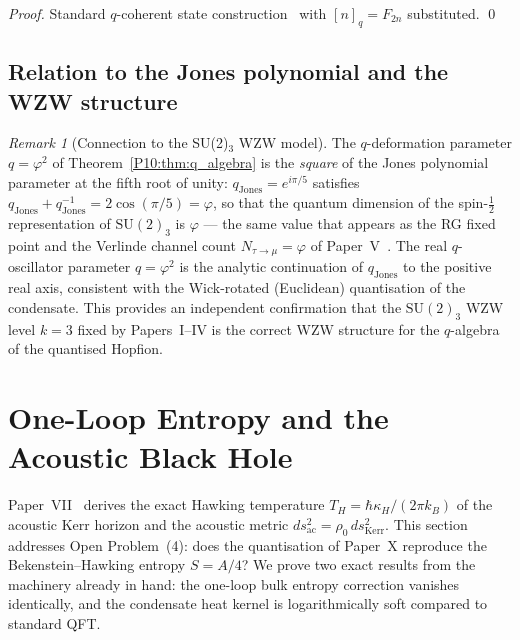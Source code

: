 \documentclass[11pt,a4paper]{article}
\theoremstyle{definition}
\theoremstyle{remark}
\newtheorem{remark}[theorem]{Remark}
\newcommand{\vp}{\varphi}
\begin{document}
\begin{proof}
Standard $q$-coherent state construction~\cite{Macfarlane1989,Biedenharn1989}
with $[n]_q = F_{2n}$ substituted.
\qed
\end{proof}

\subsection{Relation to the Jones polynomial and the WZW structure}

\begin{remark}[Connection to the SU(2)$_3$ WZW model]
\label{P10:rem:jones}
The $q$-deformation parameter $q = \vp^2$ of Theorem~\ref{P10:thm:q_algebra}
is the \emph{square} of the Jones polynomial parameter at the fifth root
of unity: $q_\mathrm{Jones} = e^{i\pi/5}$ satisfies
$q_\mathrm{Jones} + q_\mathrm{Jones}^{-1} = 2\cos(\pi/5) = \vp$,
so that the quantum dimension of the spin-$\tfrac{1}{2}$ representation
of $\mathrm{SU}(2)_3$ is $\vp$ --- the same value that appears as the
RG fixed point and the Verlinde channel count $N_{\tau\to\mu} = \vp$
of Paper~V~\cite{Paper5}.
The real $q$-oscillator parameter $q = \vp^2$ is the analytic continuation
of $q_\mathrm{Jones}$ to the positive real axis, consistent with the
Wick-rotated (Euclidean) quantisation of the condensate.
This provides an independent confirmation that the $\mathrm{SU}(2)_3$ WZW
level $k=3$ fixed by Papers~I--IV is the correct WZW structure for the
$q$-algebra of the quantised Hopfion.
\end{remark}

\section{One-Loop Entropy and the Acoustic Black Hole}
\label{P10:sec:hawking}

Paper~VII~\cite{Paper7} derives the exact Hawking temperature
$T_H = \hbar\kappa_H/(2\pi k_B)$ of the acoustic Kerr horizon
and the acoustic metric $ds^2_\mathrm{ac} = \rho_0\,ds^2_\mathrm{Kerr}$.
This section addresses Open Problem~(4): does the quantisation of Paper~X
reproduce the Bekenstein--Hawking entropy $S = A/4$?
We prove two exact results from the machinery already in hand: the
one-loop bulk entropy correction vanishes identically, and the condensate
heat kernel is logarithmically soft compared to standard QFT.
\end{document}
